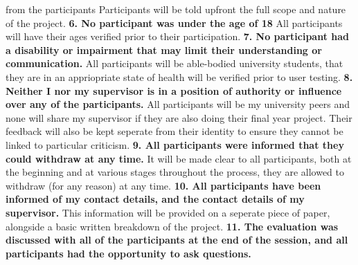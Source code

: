 \documentclass{report}
\begin{document}
\begin{raggedright}
{from the participants}
\newline
\newline
Participants will be told upfront the full scope and nature of the project.
\newline
\newline
\textbf{6. No participant was under the age of 18}
\newline
\newline
All participants will have their ages verified prior to their participation.
\newline
\newline
\textbf{7. No participant had a disability or impairment that may limit their understanding
or communication.}
\newline
\newline
All participants will be able-bodied university students, that they are in an appriopriate state of health will be verified prior to user testing.
\newline
\newline
\textbf{8. Neither I nor my supervisor is in a position of authority or influence over any of
the participants.}
\newline
\newline
All participants will be my university peers and none will share my supervisor if they are also doing their final year project. Their feedback will also be kept seperate from their identity to ensure they cannot be linked to particular criticism.
\newline
\newline
\textbf{9. All participants were informed that they could withdraw at any time.}
\newline
\newline
It will be made clear to all participants, both at the beginning and at various stages throughout the process, they are allowed to withdraw (for any reason) at any time.
\newline
\newline
\textbf{10. All participants have been informed of my contact details, and the contact details
of my supervisor.}
\newline
\newline
This information will be provided on a seperate piece of paper, alongside a basic written breakdown of the project.
\newline
\newline
\textbf{11. The evaluation was discussed with all of the participants at the end of the
session, and all participants had the opportunity to ask questions.}

\end{raggedright}
\end{document}
